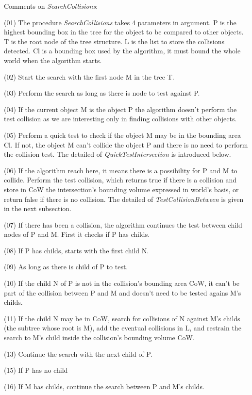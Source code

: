 \documentclass[12pt, a4paper]{article}
\begin{document}
Comments on {\em SearchCollisions}:

(01) The procedure {\em SearchCollisions} takes 4 parameters in argument. P is the highest bounding box in the tree for the object to be compared to other objects. T is the root node of the tree structure. L is the list to store the collisions detected. Cl is a bounding box used by the algorithm, it must bound the whole world when the algorithm starts.

(02) Start the search with the first node M in the tree T.

(03) Perform the search as long as there is node to test against P.

(04) If the current object M is the object P the algorithm doesn't perform the test collision as we are interesting only in finding collisions with other objects.

(05) Perform a quick test to check if the object M may be in the bounding area Cl. If not, the object M can't collide the object P and there is no need to perform the collision test. The detailed of {\em QuickTestIntersection} is introduced below.

(06) If the algorithm reach here, it means there is a possibility for P and M to collide. Perform the test collision, which returns true if there is a collision and store in CoW the intersection's bounding volume expressed in world's basis, or return false if there is no collision. The detailed of {\em TestCollisionBetween} is given in the next subsection.

(07) If there has been a collision, the algorithm continues the test between child nodes of P and M. First it checks if P has childs.

(08) If P has childs, starts with the first child N.

(09) As long as there is child of P to test.

(10) If the child N of P is not in the collision's bounding area CoW, it can't be part of the collision between P and M and doesn't need to be tested agains M's childs.

(11) If the child N may be in CoW, search for collisions of N against M's childs (the subtree whose root is M), add the eventual collisions in L, and restrain the search to M's child inside the collision's bounding volume CoW.

(13) Continue the search with the next child of P.

(15) If P has no child

(16) If M has childs, continue the search between P and M's childs.
\end{document}
